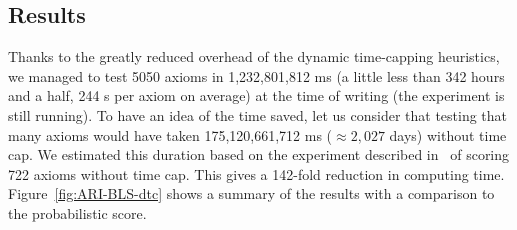 \documentclass{sig-alternate}
\newcommand{\todo}[1]{\par\framebox{\parbox{3in}{#1}}\par}
\begin{document}
\subsection{Results}


Thanks to the greatly reduced overhead of the dynamic time-capping heuristics,
we managed to test 5050 axioms in 1,232,801,812 ms (a little less than 342 hours and a half,
244 s per axiom on average)
at the time of writing (the experiment is still running).
To have an idea of the time saved, let us consider that testing that many axioms would have taken
175,120,661,712 ms ($\approx 2,027$ days) without time cap. We estimated this duration based on
the experiment described in~\cite{TettamanziFaronZuckerGandon2014ekaw} of scoring 722 axioms without time cap. This gives a 142-fold reduction in computing time.
Figure~\ref{fig:ARI-BLS-dtc} shows a summary of the results with a comparison
to the probabilistic score.
\end{document}
